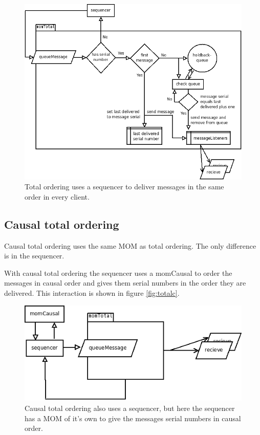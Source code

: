 \documentclass[english]{article}
\begin{document}
\begin{figure}
\includegraphics[width=\textwidth]{momTotal.png}
\caption{Total ordering uses a sequencer to deliver messages in the same order in every client.}
\label{fig:total}
\end{figure}

\subsection{Causal total ordering}
Causal total ordering uses the same MOM as total ordering. The only difference is in the sequencer.

With causal total ordering the sequencer uses a momCausal to order the messages in causal order and gives them serial numbers in the order they are delivered. This interaction is shown in figure \vref{fig:totalc}.

\begin{figure}
\includegraphics[width=\textwidth]{momTotalC.png}
\caption{Causal total ordering also uses a sequencer, but here the sequencer has a MOM of it's own to give the messages serial numbers in causal order.}
\label{fig:totalc}
\end{figure}
\end{document}

